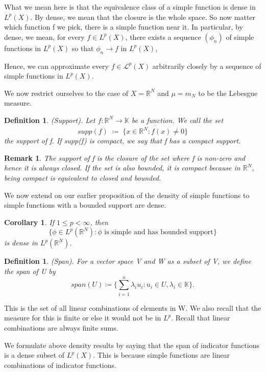 \documentclass[twoside]{article}
\newtheorem{corollary}[theorem]{Corollary}
\newtheorem{remark}[theorem]{Remark}
\newtheorem{definition}[theorem]{Definition}
\begin{document}
What we mean here is that the equivalence class of a simple function is dense in $L^p(X)$. By dense, we mean that the closure is the whole space. So now matter which function f we pick, there is a simple function near it. In particular, by dense, we mean, for every $f \in L^p(X)$, there exists a sequence $(\phi_n)$ of simple functions in $L^p(X)$ so that $\phi_n \rightarrow f$ in $L^p(X)$,

Hence, we can approximate every $f \in \mathcal{L}^p(X)$ arbitrarily closely by a sequence of simple functions in $L^p(X)$.

\bigskip

We now restrict ourselves to the case of $X = \mathbb{R}^N$ and $\mu = m_N$ to be the Lebesgue measure.

\begin{definition}(Support). Let $f: \mathbb{R}^N \rightarrow \mathbb{K}$ be a function. We call the set
$$
supp(f) \; \coloneqq \; \overline{\{x \in \mathbb{R}^N: f(x) \neq 0\}}
$$
the support of f. If supp(f) is compact, we say that f has a compact support.
\end{definition}

\begin{remark} The support of f is the closure of the set where f is non-zero and hence it is always closed. If the set is also bounded, it is compact because in $\mathbb{R}^N$, being compact is equivalent to closed and bounded.
\end{remark}

We now extend on our earlier proposition of the density of simple functions to simple functions with a bounded support are dense.
\begin{corollary} If $1 \leq p < \infty$, then 
$$
\{\phi \in L^p(\mathbb{R}^N): \phi \text{ is simple and has bounded support}\}
$$
is dense in $L^p(\mathbb{R}^N)$.
\end{corollary}

\begin{definition}(Span). For a vector space V and W as a subset of V, we define the span of U by
$$
span(U) \coloneqq \{\sum_{i=1}^n\lambda_iu_i: u_i \in U, \lambda_i \in \mathbb{K}\}.
$$
\end{definition}

This is the set of all linear combinations of elements in W. We also recall that the measure for this is finite or else it would not be in $L^p$. Recall that linear combinations are always finite sums.

We formulate above density results by saying that the span of indicator functions is a dense subset of $L^p(X)$. This is because simple functions are linear combinations of indicator functions.
\end{document}
